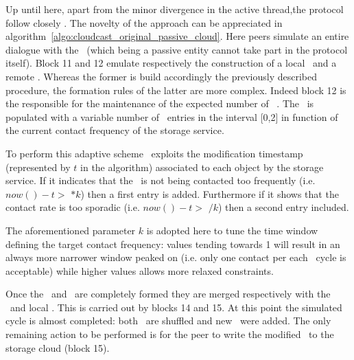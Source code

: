 Up until here, apart from the minor divergence in the active
thread,the protocol follow closely \cyclon. The novelty of the
approach can be appreciated in
algorithm~\ref{algo:cloudcast_original_passive_cloud}.
Here peers simulate an entire dialogue with the \cloud\ (which being
a passive entity cannot take part in the protocol
itself). Block 11 and 12 emulate respectively
the construction of a local \request\ and a remote \reply. Whereas
the former is build accordingly the previously described procedure,
the formation rules of the latter are more complex. Indeed
block 12 is the responsible for the maintenance of the
expected number of \cloud\ \descriptors. The \reply\ is populated with
a variable number of \cloud\ entries in the interval [0,2] in function
of the current contact frequency of the storage service.

To perform this adaptive scheme \cloudcast\ exploits the modification
timestamp (represented by $t$ in the algorithm) associated to each
object by the storage service. If it indicates that the \cloud\ is not
being contacted too frequently (i.e. $now() - t >$ \deltacyclon $* k$)
then a first entry is added. Furthermore if it shows that the contact
rate is too sporadic (i.e. $now() - t >$ \deltacyclon $/ k$) then a
second entry included.

The aforementioned parameter $k$ is adopted here to tune the time
window defining the target contact frequency: values tending towards 1
will result in an always more narrower window peaked on \deltacyclon
(i.e. only one contact per each \cyclon\ cycle is acceptable) while
higher values allows more relaxed constraints.

Once the \request\ and \reply\ are completely formed they are merged
respectively with the \cloud\ and local \view. This is carried out by
blocks 14 and 15. At this point the
simulated cycle is almost completed: both \views\ are shuffled and new
\descriptors\ were added. The only remaining action to be performed is
for the peer to write the modified \view\ to the storage cloud
(block 15).

